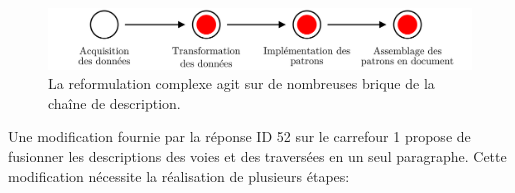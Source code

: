 \begin{figure}
    \centering
    \includegraphics[width=\textwidth]{images/evaluation/pipeline/pipeline_reformulation_complexe.pdf}
    \caption[Reformulation complexe dans la chaîne de description]{La reformulation complexe agit sur de nombreuses brique de la chaîne de description.}
    \label{fig:evaluation_reformulation_complexe}
\end{figure}

\newpar{}

Une modification fournie par la réponse ID 52 sur le carrefour 1 propose de fusionner les descriptions des voies et des traversées en un seul paragraphe. Cette modification nécessite la réalisation de plusieurs étapes:

